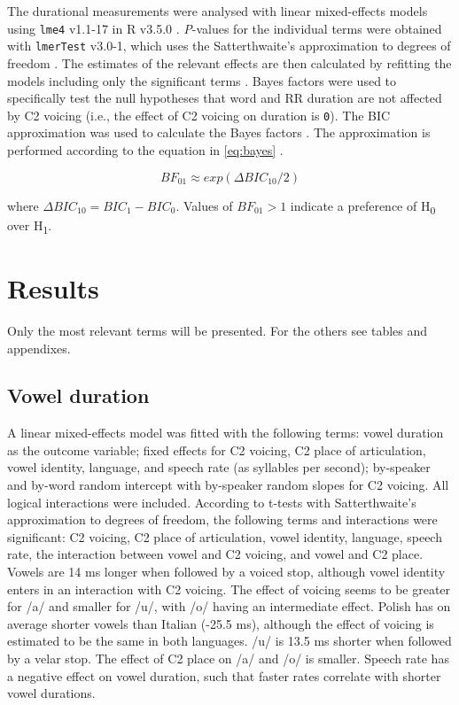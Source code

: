 \documentclass[]{JASAnew}
\begin{document}
The durational measurements were analysed with linear mixed-effects
models using \texttt{lme4} v1.1-17 in R v3.5.0
\citep{r-core-team2018, bates2015}. \emph{P}-values for the individual
terms were obtained with \texttt{lmerTest} v3.0-1, which uses the
Satterthwaite's approximation to degrees of freedom
\citep{kuznetsova2017}. The estimates of the relevant effects are then
calculated by refitting the models including only the significant terms
\citep[step-down approach,][]{diggle2002, zuur2009}. Bayes factors were
used to specifically test the null hypotheses that word and RR duration
are not affected by C2 voicing (i.e., the effect of C2 voicing on
duration is \texttt{0}). The BIC approximation was used to calculate the
Bayes factors \citep{wagenmakers2007}. The approximation is performed
according to the equation in \ref{eq:bayes}
\citep[p.~796]{wagenmakers2007}.

\begin{equation}
\label{eq:bayes}
BF_{01} \approx exp(\Delta{}BIC_{10}/2)
\end{equation}

where \(\Delta{}BIC_{10} = BIC_1 - BIC_0\). Values of \(BF_{01} > 1\)
indicate a preference of H\textsubscript{0} over H\textsubscript{1}.

\hypertarget{results}{%
\section{Results}\label{results}}

Only the most relevant terms will be presented. For the others see
tables and appendixes.

\hypertarget{vowel-duration}{%
\subsection{Vowel duration}\label{vowel-duration}}

A linear mixed-effects model was fitted with the following terms: vowel
duration as the outcome variable; fixed effects for C2 voicing, C2 place
of articulation, vowel identity, language, and speech rate (as syllables
per second); by-speaker and by-word random intercept with by-speaker
random slopes for C2 voicing. All logical interactions were included.
According to t-tests with Satterthwaite's approximation to degrees of
freedom, the following terms and interactions were significant: C2
voicing, C2 place of articulation, vowel identity, language, speech
rate, the interaction between vowel and C2 voicing, and vowel and C2
place. Vowels are 14 ms longer when followed by a voiced stop, although
vowel identity enters in an interaction with C2 voicing. The effect of
voicing seems to be greater for /a/ and smaller for /u/, with /o/ having
an intermediate effect. Polish has on average shorter vowels than
Italian (-25.5 ms), although the effect of voicing is estimated to be
the same in both languages. /u/ is 13.5 ms shorter when followed by a
velar stop. The effect of C2 place on /a/ and /o/ is smaller. Speech
rate has a negative effect on vowel duration, such that faster rates
correlate with shorter vowel durations.
\end{document}
